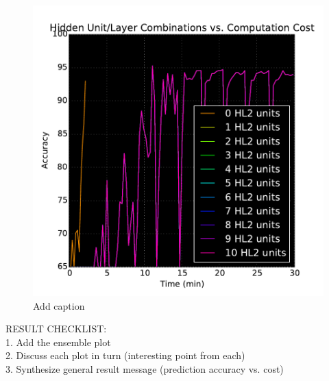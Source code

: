 \begin{figure}[t]

\centering
\includegraphics[width=0.95\columnwidth]{figs/wbcd_timing}
\caption {Add caption}
\label{fig:wbcd_timing}

\end{figure}

RESULT CHECKLIST:\\
1. Add the ensemble plot\\
2. Discuss each plot in turn (interesting point from each)\\
3. Synthesize general result message (prediction accuracy vs. cost)\\
